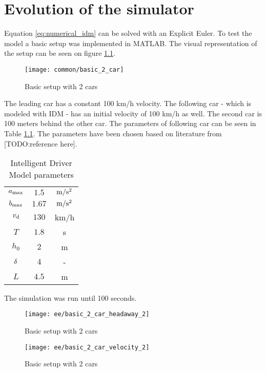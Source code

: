 \chapter{Evolution of the simulator}
	Equation \ref{eq:numerical_idm} can be solved with an Explicit Euler. To test the model a basic setup was implemented in MATLAB. The visual representation of the setup can be seen on figure \ref{fig:basic2car}.
	\begin{figure}[ht]
		\centering
		\texttt{[image: common/basic\_2\_car]}
		\caption{Basic setup with 2 cars}
		\label{fig:basic2car}
	\end{figure}
	The leading car has a constant 100 km/h velocity. The following car - which is modeled with IDM - has an initial velocity of 100 km/h as well. The second car is 100 meters behind the other car. The parameters of following car can be seen in Table \ref{tab:idm_params}. The parameters have been chosen based on literature from [TODO:reference here].
	\begin{table}[ht]
		\begin{center}
			\begin{tabular}{ |c|c|c| }
				\hline
				$a_{\rm max}$ & $1.5$ & $\rm m/s^2$ \\
				$b_{\rm max}$ & $1.67$ & $\rm m/s^2$ \\
				$v_{\rm d}$ & $130$ & km/h \\
				$T$ & $1.8$ & s \\
				$h_0$ & $2$ & m \\
				$\rm \delta$ & $4$ & - \\
				$L$ & $4.5$ & m \\
				\hline
			\end{tabular}
		\end{center}
		\caption{Intelligent Driver Model parameters}
		\label{tab:idm_params}
	\end{table}
	The simulation was run until 100 seconds.
	\begin{figure}
		\centering
		\begin{minipage}{.5\textwidth}
			\centering
			\texttt{[image: ee/basic\_2\_car\_headaway\_2]}
			\caption{Basic setup with 2 cars}
			\label{fig:basic2car_result_1}
		\end{minipage}\hfill
		\begin{minipage}{.5\textwidth}
			\centering
			\texttt{[image: ee/basic\_2\_car\_velocity\_2]}
			\caption{Basic setup with 2 cars}
			\label{fig:basic2car_result_2}
		\end{minipage}
	\end{figure}